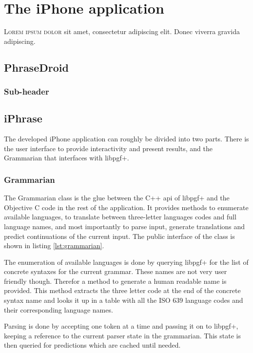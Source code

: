 \chapter{The iPhone application}
\lettrine[lines=4, loversize=-0.1, lraise=0.1]{L}{orem ipsum dolor} sit amet, consectetur adipiscing elit. Donec viverra gravida adipiscing.


\section{PhraseDroid}
\subsection{Sub-header}


\section{iPhrase}
The developed iPhone application can roughly be divided into two parts. There is the user interface to provide interactivity and present results, and the Grammarian that interfaces with libpgf+.


\subsection{Grammarian}
\label{sec:grammarian}
The Grammarian class is the glue between the C++ api of libpgf+ and the Objective C code in the rest of the application. It provides methods to enumerate available languages, to translate between three-letter languages codes and full language names, and most importantly to parse input, generate translations and predict continuations of the current input. The public interface of the class is shown in listing \ref{lst:grammarian}.

The enumeration of available languages is done by querying libpgf+ for the list of concrete syntaxes for the current grammar. These names are not very user friendly though. Therefor a method to generate a human readable name is provided. This method extracts the three letter code at the end of the concrete syntax name and looks it up in a table with all the ISO 639 language codes and their corresponding language names.

Parsing is done by accepting one token at a time and passing it on to libpgf+, keeping a reference to the current parser state in the grammarian. This state is then queried for predictions which are cached until needed.

